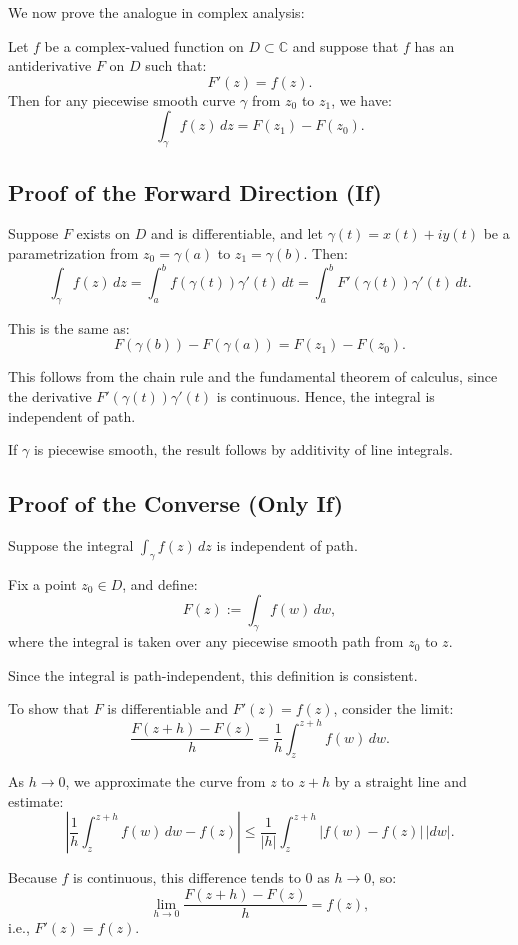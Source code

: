 \documentclass[12pt]{article}
\theoremstyle{definition} %
\theoremstyle{plain} %
\begin{document}
We now prove the analogue in complex analysis:

Let $f$ be a complex-valued function on $D \subset \mathbb{C}$ and suppose that $f$ has an antiderivative $F$ on $D$ such that:
\[
F'(z) = f(z).
\]
Then for any piecewise smooth curve $\gamma$ from $z_0$ to $z_1$, we have:
\[
\int_{\gamma} f(z)\,dz = F(z_1) - F(z_0).
\]

\subsection*{Proof of the Forward Direction (If)}

Suppose $F$ exists on $D$ and is differentiable, and let $\gamma(t) = x(t) + iy(t)$ be a parametrization from $z_0 = \gamma(a)$ to $z_1 = \gamma(b)$. Then:
\[
\int_{\gamma} f(z)\,dz = \int_a^b f(\gamma(t)) \gamma'(t)\,dt = \int_a^b F'(\gamma(t)) \gamma'(t)\,dt.
\]

This is the same as:
\[
F(\gamma(b)) - F(\gamma(a)) = F(z_1) - F(z_0).
\]

This follows from the chain rule and the fundamental theorem of calculus, since the derivative $F'(\gamma(t)) \gamma'(t)$ is continuous. Hence, the integral is independent of path.

If $\gamma$ is piecewise smooth, the result follows by additivity of line integrals.

\subsection*{Proof of the Converse (Only If)}

Suppose the integral $\int_{\gamma} f(z)\,dz$ is independent of path.

Fix a point $z_0 \in D$, and define:
\[
F(z) := \int_{\gamma} f(w)\,dw,
\]
where the integral is taken over any piecewise smooth path from $z_0$ to $z$.

Since the integral is path-independent, this definition is consistent.

To show that $F$ is differentiable and $F'(z) = f(z)$, consider the limit:
\[
\frac{F(z+h) - F(z)}{h} = \frac{1}{h} \int_{z}^{z+h} f(w)\,dw.
\]

As $h \to 0$, we approximate the curve from $z$ to $z+h$ by a straight line and estimate:
\[
\left| \frac{1}{h} \int_{z}^{z+h} f(w)\,dw - f(z) \right| \leq \frac{1}{|h|} \int_{z}^{z+h} |f(w) - f(z)|\,|dw|.
\]

Because $f$ is continuous, this difference tends to $0$ as $h \to 0$, so:
\[
\lim_{h \to 0} \frac{F(z+h) - F(z)}{h} = f(z),
\]
i.e., $F'(z) = f(z)$.
\end{document}
